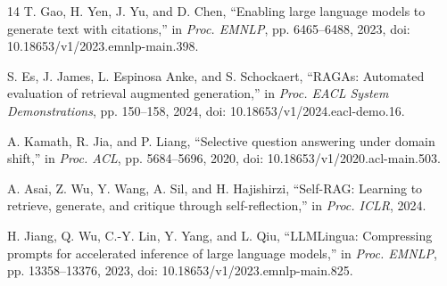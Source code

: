 \documentclass[conference]{IEEEtran}
\begin{document}
\begin{thebibliography}{14}
 T. Gao, H. Yen, J. Yu, and D. Chen, ``Enabling large language models to generate text with citations,'' in \emph{Proc. EMNLP}, pp. 6465--6488, 2023, doi: 10.18653/v1/2023.emnlp-main.398.

 S. Es, J. James, L. Espinosa Anke, and S. Schockaert, ``RAGAs: Automated evaluation of retrieval augmented generation,'' in \emph{Proc. EACL System Demonstrations}, pp. 150--158, 2024, doi: 10.18653/v1/2024.eacl-demo.16.

 A. Kamath, R. Jia, and P. Liang, ``Selective question answering under domain shift,'' in \emph{Proc. ACL}, pp. 5684--5696, 2020, doi: 10.18653/v1/2020.acl-main.503.

 A. Asai, Z. Wu, Y. Wang, A. Sil, and H. Hajishirzi, ``Self-RAG: Learning to retrieve, generate, and critique through self-reflection,'' in \emph{Proc. ICLR}, 2024.

 H. Jiang, Q. Wu, C.-Y. Lin, Y. Yang, and L. Qiu, ``LLMLingua: Compressing prompts for accelerated inference of large language models,'' in \emph{Proc. EMNLP}, pp. 13358--13376, 2023, doi: 10.18653/v1/2023.emnlp-main.825.

\end{thebibliography}
\end{document}
